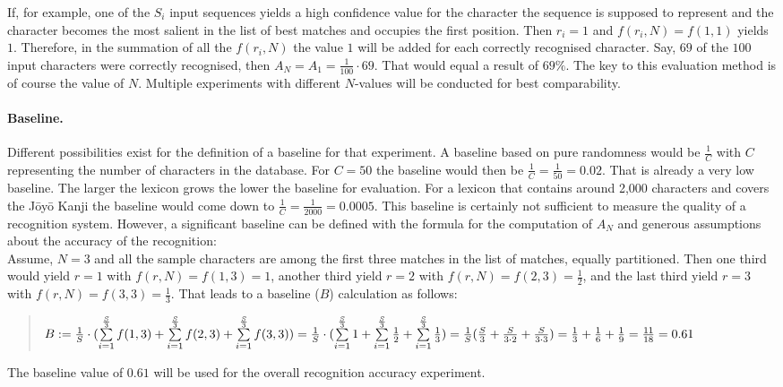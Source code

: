 If, for example, one of the \(S_{i}\) input sequences yields a high 
confidence value for the character the sequence is supposed to represent and 
the character becomes the most salient in the list of best matches
and occupies the first position. Then \(r_{i} = 1\) and \(f(r_{i},N) = f(1,1)\) 
yields \(1\).
Therefore, in the summation of all the \(f(r_{i},N)\) the value \(1\) 
will be added for each correctly recognised character.
Say, \(69\) of the \(100\) input characters were correctly recognised,
then \(A_{N} = A_{1} = \frac{1}{100} \cdot 69\). That would equal a 
result of \(69\%\). The key to this evaluation method is of course the 
value of \(N\). Multiple experiments with different \(N\)-values will be 
conducted for best comparability.

\paragraph{Baseline.} Different possibilities exist for the definition of a 
baseline for that experiment. A baseline based on pure randomness would 
be \(\frac{1}{C}\) with \(C\) representing the number of characters 
in the database. 
For \(C = 50\) the baseline would then be \(\frac{1}{C} = \frac{1}{50} = 0.02\).
That is already a very low baseline. The larger the lexicon grows the
lower the baseline for evaluation. For a lexicon that contains around 2,000 
characters and covers the Jōyō Kanji the baseline would come down to
\(\frac{1}{C} = \frac{1}{2000} = 0.0005\).
This baseline is certainly not sufficient to measure the quality of a 
recognition system. However, a significant baseline can be defined 
with the formula for the computation of \(A_N\) and generous assumptions
about the accuracy of the recognition: \\
Assume, \(N = 3\) and all the sample characters are among the first three 
matches in the list of matches, equally partitioned.
Then one third would yield \(r = 1\) with \(f(r,N)=f(1,3)=1\),
another third yield \(r = 2\) with \(f(r,N)=f(2,3)=\frac{1}{2}\),
and the last third yield \(r = 3\) with \(f(r,N)=f(3,3)=\frac{1}{3}\).
That leads to a baseline (\(B\)) calculation as follows:
\begin{quote}
  \(
    B := \frac{1}{S} \cdot (\sum\limits_{i=1}^{\frac{S}{3}}{f(1,3)} + \sum\limits_{i=1}^{\frac{S}{3}}{f(2,3)} + \sum\limits_{i=1}^{\frac{S}{3}}{f(3,3)}) \\
       = \frac{1}{S} \cdot (\sum\limits_{i=1}^{\frac{S}{3}}{1} + \sum\limits_{i=1}^{\frac{S}{3}}{\frac{1}{2}} + \sum\limits_{i=1}^{\frac{S}{3}}{\frac{1}{3}}) \\
       = \frac{1}{S} (\frac{S}{3} + \frac{S}{3 \cdot 2} + \frac{S}{3 \cdot 3}) 
       = \frac{1}{3} + \frac{1}{6} + \frac{1}{9}
       = \frac{11}{18} = 0.61
  \)
\end{quote}
The baseline value of \(0.61\) will be used for the overall recognition accuracy
experiment.

